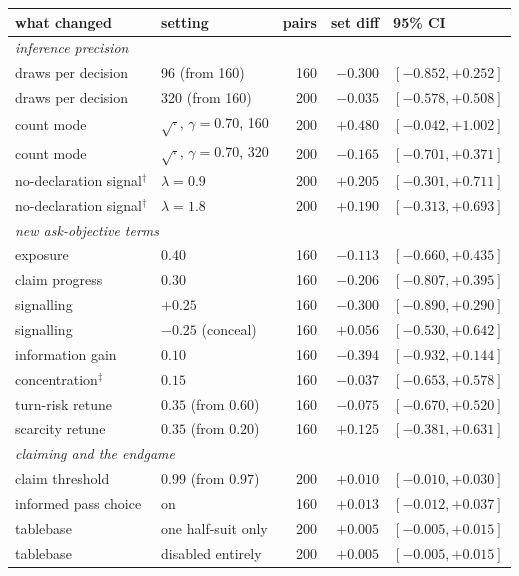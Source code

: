 \documentclass[11pt,a4paper]{article}
\begin{document}
\begin{table}[t]
\centering
\small
\begin{tabular}{llrrl}
\toprule
what changed & setting & pairs & set diff & 95\% CI \\
\midrule
\multicolumn{5}{l}{\emph{inference precision}}\\
draws per decision & 96 (from 160) & 160 & $-0.300$ & $[-0.852, +0.252]$ \\
draws per decision & 320 (from 160) & 200 & $-0.035$ & $[-0.578, +0.508]$ \\
count mode & $\sqrt{\cdot}$, $\gamma{=}0.70$, 160 & 200 & $+0.480$ & $[-0.042, +1.002]$ \\
count mode & $\sqrt{\cdot}$, $\gamma{=}0.70$, 320 & 200 & $-0.165$ & $[-0.701, +0.371]$ \\
no-declaration signal$^\dagger$ & $\lambda = 0.9$ & 200 & $+0.205$ & $[-0.301, +0.711]$ \\
no-declaration signal$^\dagger$ & $\lambda = 1.8$ & 200 & $+0.190$ & $[-0.313, +0.693]$ \\
\midrule
\multicolumn{5}{l}{\emph{new ask-objective terms}}\\
exposure & $0.40$ & 160 & $-0.113$ & $[-0.660, +0.435]$ \\
claim progress & $0.30$ & 160 & $-0.206$ & $[-0.807, +0.395]$ \\
signalling & $+0.25$ & 160 & $-0.300$ & $[-0.890, +0.290]$ \\
signalling & $-0.25$ (conceal) & 160 & $+0.056$ & $[-0.530, +0.642]$ \\
information gain & $0.10$ & 160 & $-0.394$ & $[-0.932, +0.144]$ \\
concentration$^\ddagger$ & $0.15$ & 160 & $-0.037$ & $[-0.653, +0.578]$ \\
turn-risk retune & $0.35$ (from $0.60$) & 160 & $-0.075$ & $[-0.670, +0.520]$ \\
scarcity retune & $0.35$ (from $0.20$) & 160 & $+0.125$ & $[-0.381, +0.631]$ \\
\midrule
\multicolumn{5}{l}{\emph{claiming and the endgame}}\\
claim threshold & $0.99$ (from $0.97$) & 200 & $+0.010$ & $[-0.010, +0.030]$ \\
informed pass choice & on & 160 & $+0.013$ & $[-0.012, +0.037]$ \\
tablebase & one half-suit only & 200 & $+0.005$ & $[-0.005, +0.015]$ \\
tablebase & disabled entirely & 200 & $+0.005$ & $[-0.005, +0.015]$ \\

\end{tabular}
\end{table}
\end{document}

